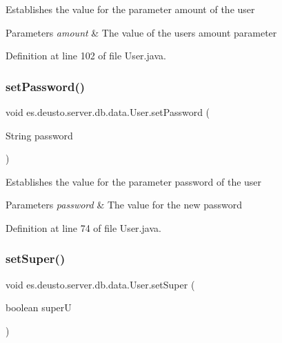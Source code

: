 Establishes the value for the parameter amount of the user 
\begin{DoxyParams}{Parameters}
{\em amount} & The value of the users amount parameter \\
\hline
\end{DoxyParams}


Definition at line 102 of file User.\+java.

\mbox{\label{classes_1_1deusto_1_1server_1_1db_1_1data_1_1_user_a0098f77da63338c8374ea1e5baab28c9}} 
\subsubsection{\texorpdfstring{set\+Password()}{setPassword()}}
{\footnotesize\ttfamily void es.\+deusto.\+server.\+db.\+data.\+User.\+set\+Password (\begin{DoxyParamCaption}\item[{String}]{password }\end{DoxyParamCaption})}

Establishes the value for the parameter password of the user 
\begin{DoxyParams}{Parameters}
{\em password} & The value for the new password \\
\hline
\end{DoxyParams}


Definition at line 74 of file User.\+java.

\mbox{\label{classes_1_1deusto_1_1server_1_1db_1_1data_1_1_user_a0e2c3f3fea559e9ab7eaab197fe9e015}} 
\subsubsection{\texorpdfstring{set\+Super()}{setSuper()}}
{\footnotesize\ttfamily void es.\+deusto.\+server.\+db.\+data.\+User.\+set\+Super (\begin{DoxyParamCaption}\item[{boolean}]{superU }\end{DoxyParamCaption})}

